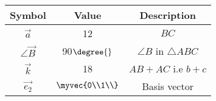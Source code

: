 \begin{tabular}{|c|c|c|}
  \hline
  \textbf{Symbol}&\textbf{Value}&\textbf{Description}\\
  \hline
  $\vec{a}$ & 12 & $BC$\\
  \hline
  $\angle{\vec{B}}$ & 90$\degree{}$ & $\angle{B}$ in $\triangle ABC$ \\
  \hline
  $\vec{k}$ & 18 & $AB+AC$ i.e $b+c$ \\
  \hline 
  $\vec{e_2}$ & $\myvec{0\\1\\}$ & Basis vector\\
  \hline   
\end{tabular}\\
